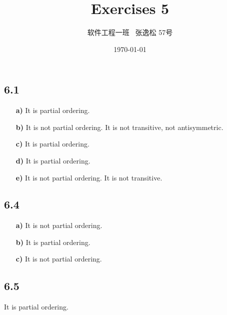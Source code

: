 \documentclass[10pt]{ctexart}
\title{Exercises 5}
\author{软件工程一班 \ 张逸松 57号}
\date{\today}
\begin{document}
    \maketitle
    \subsection*{6.1}
        \begin{itemize}
            \item [\textbf{a)}] It is partial ordering.
            \item [\textbf{b)}] It is not partial ordering. It is not transitive, not antisymmetric.
            \item [\textbf{c)}] It is partial ordering.
            \item [\textbf{d)}] It is partial ordering.
            \item [\textbf{e)}] It is not partial ordering. It is not transitive.
        \end{itemize}
    \subsection*{6.4}
        \begin{itemize}
            \item [\textbf{a)}] It is not partial ordering.
            \item [\textbf{b)}] It is partial ordering.
            \item [\textbf{c)}] It is not partial ordering.
        \end{itemize}
    \subsection*{6.5}
        It is partial ordering.
\end{document}

